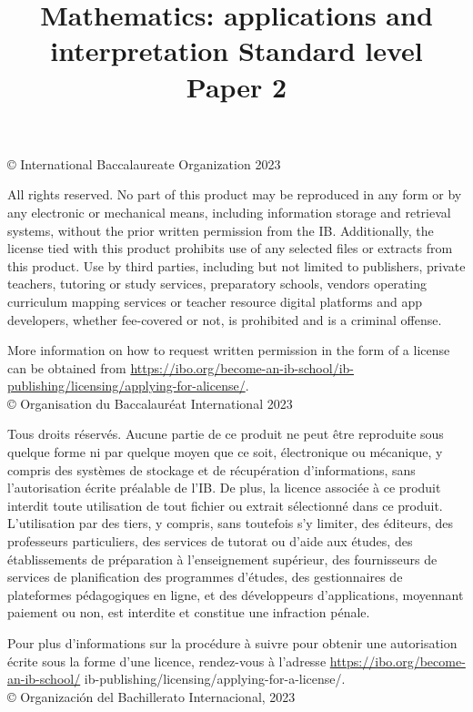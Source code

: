 \documentclass[10pt]{article}
\title{Mathematics: applications and interpretation Standard level \\
 Paper 2 }
\author{}
\date{}
\begin{document}
\maketitle
© International Baccalaureate Organization 2023

All rights reserved. No part of this product may be reproduced in any form or by any electronic or mechanical means, including information storage and retrieval systems, without the prior written permission from the IB. Additionally, the license tied with this product prohibits use of any selected files or extracts from this product. Use by third parties, including but not limited to publishers, private teachers, tutoring or study services, preparatory schools, vendors operating curriculum mapping services or teacher resource digital platforms and app developers, whether fee-covered or not, is prohibited and is a criminal offense.

More information on how to request written permission in the form of a license can be obtained from \href{https://ibo.org/become-an-ib-school/ib-publishing/licensing/applying-for-alicense/}{https://ibo.org/become-an-ib-school/ib-publishing/licensing/applying-for-alicense/}.\\
© Organisation du Baccalauréat International 2023

Tous droits réservés. Aucune partie de ce produit ne peut être reproduite sous quelque forme ni par quelque moyen que ce soit, électronique ou mécanique, y compris des systèmes de stockage et de récupération d'informations, sans l'autorisation écrite préalable de l'IB. De plus, la licence associée à ce produit interdit toute utilisation de tout fichier ou extrait sélectionné dans ce produit. L'utilisation par des tiers, y compris, sans toutefois s'y limiter, des éditeurs, des professeurs particuliers, des services de tutorat ou d'aide aux études, des établissements de préparation à l'enseignement supérieur, des fournisseurs de services de planification des programmes d'études, des gestionnaires de plateformes pédagogiques en ligne, et des développeurs d'applications, moyennant paiement ou non, est interdite et constitue une infraction pénale.

Pour plus d'informations sur la procédure à suivre pour obtenir une autorisation écrite sous la forme d'une licence, rendez-vous à l'adresse \href{https://ibo.org/become-an-ib-school/}{https://ibo.org/become-an-ib-school/} ib-publishing/licensing/applying-for-a-license/.\\
© Organización del Bachillerato Internacional, 2023
\end{document}
